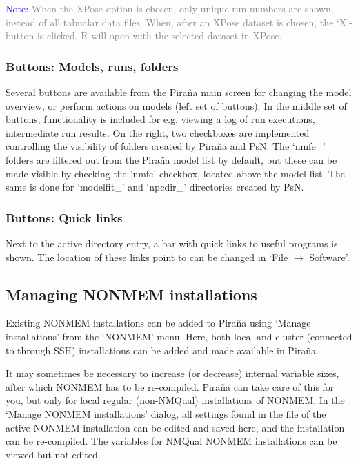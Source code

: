 \documentclass[a4,11pt]{report} \usepackage[pdftex]{graphicx}
\begin{document}
\vspace{8pt}
\noindent\scriptsize{\textcolor{Blue}{Note:} \textcolor{Grey}{When the
XPose option is chosen, only unique run numbers are shown, instead of
all tabualar data files. When, after an XPose dataset is chosen, the
`X'-button is clicked, R will open with the selected dataset in XPose.
} \normalsize

\subsubsection*{Buttons: Models, runs, folders} Several buttons are
available from the Pira\~na main screen for changing the model
overview, or perform actions on models (left set of buttons). In the
middle set of buttons, functionality is included for e.g. viewing a
log of run executions, intermediate run results. On the right, two
checkboxes are implemented controlling the visibility of folders
created by Pira\~na and PsN. The `nmfe\_' folders are filtered out
from the Pira\~na model list by default, but these can be made visible
by checking the 'nmfe' checkbox, located above the model list. The
same is done for `modelfit\_' and `npcdir\_' directories created by PsN.}
\normalsize


\subsubsection*{Buttons: Quick links} Next to the active directory entry, a bar
with quick links to useful programs is shown. The location of these links
point to can be changed in `File $\rightarrow$ Software'.

\subsection*{Managing NONMEM installations} Existing NONMEM
installations can be added to Pira\~na using `Manage installations'
from the `NONMEM' menu. Here, both local and cluster (connected to through
SSH) installations can be added and made available in Pira\~na.

It may sometimes be necessary to increase (or decrease) internal
variable sizes, after which NONMEM has to be re-compiled. Pira\~na can
take care of this for you, but only for local regular (non-NMQual)
installations of NONMEM. In the `Manage NONMEM installations' dialog,
all settings found in the  \normalfont file of the
active NONMEM installation can be edited and saved here, and the
installation can be re-compiled. The variables for NMQual NONMEM
installations can be viewed but not edited.
\end{document}
